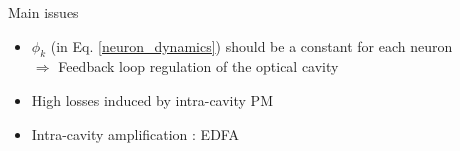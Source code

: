 \begin{frame}[allowframebreaks]{Main issues}
	\begin{itemize}
		\item $\phi_k$ (in Eq. \ref{neuron_dynamics}) should be a constant for each neuron\\ $\Longrightarrow$ \alert{Feedback loop regulation} of the optical cavity
		\item High losses induced by intra-cavity PM
		\item Intra-cavity amplification : EDFA
	\end{itemize}
\end{frame}
